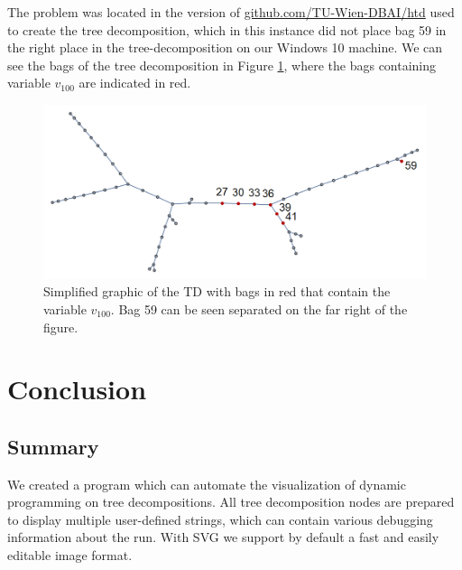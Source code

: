 \documentclass[a4paper, 12pt, bibliography=totoc]{scrartcl}
\begin{document}

The problem was located in the version of \url{github.com/TU-Wien-DBAI/htd} used to create the tree decomposition, which in this instance did not place bag 59 in the right place in the tree-decomposition on our Windows 10 machine. We can see the bags of the tree decomposition in Figure \ref{fig:bag59td}, where the bags containing variable $v_{100}$ are indicated in red. 

\begin{figure}
	\centering
	\includegraphics[width=0.9\linewidth,height=0.9\textheight,keepaspectratio]{images/stars100var100.png}
	\caption{Simplified graphic of the TD with bags in red that contain the variable $v_{100}$. Bag 59 can be seen separated on the far right of the figure.}
	\label{fig:bag59td}
\end{figure}
\section{Conclusion}\label{sec:conclusion}
\subsection{Summary}
We created a program which can automate the visualization of dynamic programming on tree decompositions. All tree decomposition nodes are prepared to display multiple user-defined strings, which can contain various debugging information about the run.
With SVG we support by default a fast and easily editable image format.\\
\end{document}
